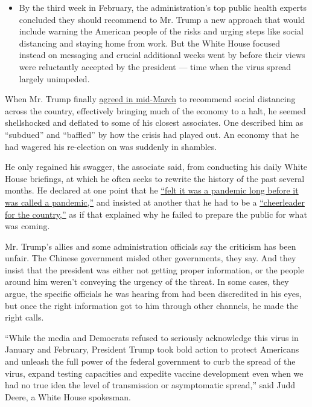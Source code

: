 \begin{itemize}
{  to develop the nation's testing capacity}, left administration
  officials with almost no insight into how rapidly the virus was
  spreading. ``We were flying the plane with no instruments,'' one
  official said.
\item
  By the third week in February, the administration's top public health
  experts concluded they should recommend to Mr. Trump a new approach
  that would include warning the American people of the risks and urging
  steps like social distancing and staying home from work. But the White
  House focused instead on messaging and crucial additional weeks went
  by before their views were reluctantly accepted by the president ---
  time when the virus spread largely unimpeded.
\end{itemize}

When Mr. Trump finally
\href{https://www.nytimes3xbfgragh.onion/2020/03/16/health/coronavirus-social-distancing-crowd-size.html}{agreed
in mid-March} to recommend social distancing across the country,
effectively bringing much of the economy to a halt, he seemed
shellshocked and deflated to some of his closest associates. One
described him as ``subdued'' and ``baffled'' by how the crisis had
played out. An economy that he had wagered his re-election on was
suddenly in shambles.

He only regained his swagger, the associate said, from conducting his
daily White House briefings, at which he often seeks to rewrite the
history of the past several months. He declared at one point that he
\href{https://www.nytimes3xbfgragh.onion/2020/03/17/us/politics/trump-coronavirus.html}{``felt
it was a pandemic long before it was called a pandemic,''} and insisted
at another that he had to be a
\href{https://www.whitehouse.gov/briefings-statements/remarks-president-trump-vice-president-pence-members-coronavirus-task-force-press-briefing-15/}{``cheerleader
for the country,''} as if that explained why he failed to prepare the
public for what was coming.

Mr. Trump's allies and some administration officials say the criticism
has been unfair. The Chinese government misled other governments, they
say. And they insist that the president was either not getting proper
information, or the people around him weren't conveying the urgency of
the threat. In some cases, they argue, the specific officials he was
hearing from had been discredited in his eyes, but once the right
information got to him through other channels, he made the right calls.

``While the media and Democrats refused to seriously acknowledge this
virus in January and February, President Trump took bold action to
protect Americans and unleash the full power of the federal government
to curb the spread of the virus, expand testing capacities and expedite
vaccine development even when we had no true idea the level of
transmission or asymptomatic spread,'' said Judd Deere, a White House
spokesman.

